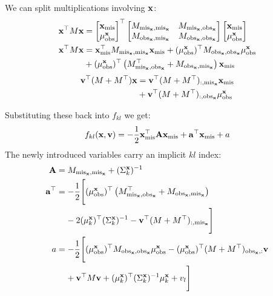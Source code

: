 \documentclass[letterpaper]{article}
\newcommand{\tp}{\top}
\newcommand{\vx}{{\bf x}}
\newcommand{\vv}{{\bf v}}
\newcommand{\va}{{\bf a}}
\newcommand{\vA}{{\bf A}}
\newcommand{\mis}{\text{mis}}
\newcommand{\obs}{\text{obs}}
\newcommand{\misx}{{\text{mis}_\vx}}
\newcommand{\obsx}{{\text{obs}_\vx}}
\begin{document}
We can split multiplications involving $\vx$:
\begin{equation*}
\begin{aligned}
\vx^\tp M \vx &=
\begin{bmatrix}\vx_\mis \\ \mu^\vx_\obs\end{bmatrix}^\tp
\begin{bmatrix} M_{\misx,\misx} & M_{\misx,\obsx} \\
M_{\obsx,\misx} & M_{\obsx,\obsx}
\end{bmatrix}
\begin{bmatrix}\vx_\mis \\ \mu^\vx_\obs\end{bmatrix} \\
\vx^\tp M \vx &= \vx_\mis^\tp M_{\misx,\misx}\vx_\mis + (\mu^\vx_\obs)^\tp M_{\obsx,\obsx}\mu^\vx_\obs \\
&+ (\mu^\vx_\obs)^\tp \left(M_{\misx,\obsx}^\tp + M_{\obsx,\misx} \right)\vx_\mis  \\
\end{aligned}
\end{equation*}
\begin{equation*}
\begin{aligned}
\vv^\tp(M + M^\tp) \vx &= \vv^\tp(M + M^\tp)_{:,\misx} \vx_\mis \\
&+ \vv^\tp(M + M^\tp)_{:,\obsx} \mu^\vx_\obs
\end{aligned}
\end{equation*}

Substituting these back into $f_{kl}$ we get:
\begin{equation*}
  f_{kl}(\vx, \vv) = -\frac{1}{2}\vx_\mis^\tp \vA \vx_\mis + \va^\tp \vx_\mis + a
\end{equation*}
The newly introduced variables carry an implicit $kl$ index:
\begin{equation*}
\begin{aligned}
\vA &= M_{\misx,\misx} + (\Sigma_k^\vx)^{-1} \\
\va^\tp &= -\frac{1}{2}\Bigg[(\mu^\vx_\obs)^\tp \left(M_{\misx,\obsx}^\tp + M_{\obsx,\misx} \right) \\
&\hspace{1.1em}- 2 (\mu_k^\vx)^\tp (\Sigma_k^\vx)^{-1} - \vv^\tp(M + M^\tp)_{:,\misx} \Bigg] \\
a &= -\frac{1}{2} \Bigg[ (\mu^\vx_\obs)^\tp M_{\obsx,\obsx}\mu^\vx_\obs - (\mu^\vx_\obs)^\tp(M + M^\tp)_{\obsx,:} \vv \\
&\hspace{1.1em} + \vv^\tp M \vv + (\mu_k^\vx)^\tp (\Sigma_k^\vx)^{-1} \mu_k^\vx + v_l \Bigg]
\end{aligned}
\end{equation*}
\end{document}
